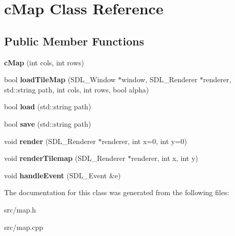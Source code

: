 \hypertarget{classc_map}{}\section{c\+Map Class Reference}
\label{classc_map}
\subsection*{Public Member Functions}
\begin{DoxyCompactItemize}
\item 
\mbox{\label{classc_map_a6a7a2f3d1353d6b010aa1837e1879ac8}} 
{\bfseries c\+Map} (int cols, int rows)
\item 
\mbox{\label{classc_map_ab79b924035753206d4fecaf35f49dbc7}} 
bool {\bfseries load\+Tile\+Map} (S\+D\+L\+\_\+\+Window $\ast$window, S\+D\+L\+\_\+\+Renderer $\ast$renderer, std\+::string path, int cols, int rows, bool alpha)
\item 
\mbox{\label{classc_map_a121a377bd1679addfd85de16988cd1c0}} 
bool {\bfseries load} (std\+::string path)
\item 
\mbox{\label{classc_map_a29406e2511d8acce4240b183ce333d13}} 
bool {\bfseries save} (std\+::string path)
\item 
\mbox{\label{classc_map_ac5374d3a254037c36387f55a4077e07f}} 
void {\bfseries render} (S\+D\+L\+\_\+\+Renderer $\ast$renderer, int x=0, int y=0)
\item 
\mbox{\label{classc_map_a7da0f6ef7079a5cf33ad35d2c781c2c2}} 
void {\bfseries render\+Tilemap} (S\+D\+L\+\_\+\+Renderer $\ast$renderer, int x, int y)
\item 
\mbox{\label{classc_map_a96efc133f941a515fc8fc136b7c7f72c}} 
void {\bfseries handle\+Event} (S\+D\+L\+\_\+\+Event \&e)
\end{DoxyCompactItemize}


The documentation for this class was generated from the following files\+:\begin{DoxyCompactItemize}
\item 
src/map.\+h\item 
src/map.\+cpp\end{DoxyCompactItemize}
